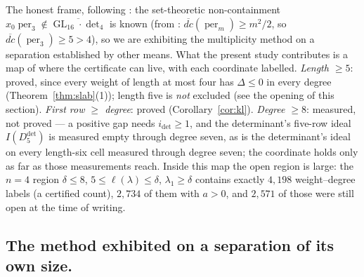 \documentclass[11pt]{amsart}
\theoremstyle{plain}
\theoremstyle{definition}
\theoremstyle{remark}
\DeclareMathOperator{\GL}{GL}
\DeclareMathOperator{\per}{per}
\newcommand{\Ddet}{D^{\det}}
\begin{document}
The honest frame, following \cite{DIP}: the set-theoretic non-containment
$x_0\per_3\notin\overline{\GL_{16}\cdot\det_4}$ is known (from
\cite[Thm.~1.0.1]{LMR}: $\overline{dc}(\per_m)\ge m^{2}/2$, so
$\overline{dc}(\per_3)\ge5>4$), so we are exhibiting the multiplicity method on
a separation established by other means.  What the present study contributes
is a map of where the certificate can live, with each coordinate labelled.
\emph{Length $\ge5$}: proved, since every weight of length at most four has
$\Delta\le0$ in every degree (Theorem~\ref{thm:slab}(1)); length five is
\emph{not} excluded (see the opening of this section).  \emph{First row
$\ge$ degree}: proved (Corollary~\ref{cor:kl}).  \emph{Degree $\ge8$}:
measured, not proved --- a positive gap needs $i_{\det}\ge1$, and the
determinant's five-row ideal $I(\Ddet_5)$ is measured empty through degree
seven, as is the determinant's ideal on every length-six cell measured through
degree seven; the coordinate holds only as far as those measurements reach.
Inside this map the open region is large: the $n=4$ region $\delta\le8$,
$5\le\ell(\lambda)\le\delta$, $\lambda_1\ge\delta$ contains exactly $4{,}198$
weight--degree labels (a certified count), $2{,}734$ of them with $a>0$, and
$2{,}571$ of those were still open at the time of writing.

\subsection*{The method exhibited on a separation of its own size.}
\end{document}
